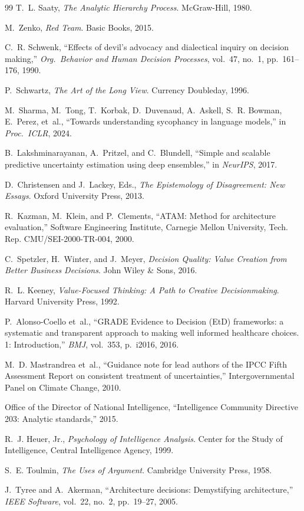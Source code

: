 \documentclass[11pt,a4paper]{article}
\begin{document}
\begin{thebibliography}{99}
T.~L. Saaty, \emph{The Analytic Hierarchy Process}. McGraw-Hill, 1980.

M.~Zenko, \emph{Red Team}. Basic Books, 2015.

C.~R. Schwenk, ``Effects of devil's advocacy and dialectical inquiry on decision making,'' \emph{Org.\ Behavior and Human Decision Processes}, vol.~47, no.~1, pp.~161--176, 1990.

P.~Schwartz, \emph{The Art of the Long View}. Currency Doubleday, 1996.

M.~Sharma, M.~Tong, T.~Korbak, D.~Duvenaud, A.~Askell, S.~R. Bowman, E.~Perez, et~al., ``Towards understanding sycophancy in language models,'' in \emph{Proc.\ ICLR}, 2024.

B.~Lakshminarayanan, A.~Pritzel, and C.~Blundell, ``Simple and scalable predictive uncertainty estimation using deep ensembles,'' in \emph{NeurIPS}, 2017.

D.~Christensen and J.~Lackey, Eds., \emph{The Epistemology of Disagreement: New Essays}. Oxford University Press, 2013.

R.~Kazman, M.~Klein, and P.~Clements, ``ATAM: Method for architecture evaluation,'' Software Engineering Institute, Carnegie Mellon University, Tech. Rep. CMU/SEI-2000-TR-004, 2000.

C.~Spetzler, H.~Winter, and J.~Meyer, \emph{Decision Quality: Value Creation from Better Business Decisions}. John Wiley \& Sons, 2016.

R.~L. Keeney, \emph{Value-Focused Thinking: A Path to Creative Decisionmaking}. Harvard University Press, 1992.

P.~Alonso-Coello et~al., ``GRADE Evidence to Decision (EtD) frameworks: a systematic and transparent approach to making well informed healthcare choices. 1: Introduction,'' \emph{BMJ}, vol.~353, p.~i2016, 2016.

M.~D. Mastrandrea et~al., ``Guidance note for lead authors of the IPCC Fifth Assessment Report on consistent treatment of uncertainties,'' Intergovernmental Panel on Climate Change, 2010.

Office of the Director of National Intelligence, ``Intelligence Community Directive 203: Analytic standards,'' 2015.

R.~J. Heuer, Jr., \emph{Psychology of Intelligence Analysis}. Center for the Study of Intelligence, Central Intelligence Agency, 1999.

S.~E. Toulmin, \emph{The Uses of Argument}. Cambridge University Press, 1958.

J.~Tyree and A.~Akerman, ``Architecture decisions: Demystifying architecture,'' \emph{IEEE Software}, vol.~22, no.~2, pp.~19--27, 2005.

\end{thebibliography}
\end{document}
